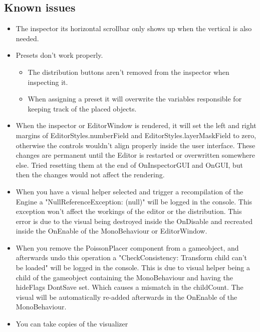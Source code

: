 \documentclass{paper}
\begin{document}
\newpage
\subsection{Known issues}
\begin{itemize}
\item The inspector its horizontal scrollbar only shows up when the vertical is also needed.
\item Presets don't work properly.
\begin{itemize}[noitemsep]
\item The distribution buttons aren't removed from the inspector when inspecting it.
\item When assigning a preset it will overwrite the variables responsible for keeping track of the placed objects.
\end{itemize}
\item When the inspector or EditorWindow is rendered, it will set the left and right margins of EditorStyles.numberField and EditorStyles.layerMaskField to zero, otherwise the controls wouldn't align properly inside the user interface. These changes are permanent until the Editor is restarted or overwritten somewhere else. Tried resetting them at the end of OnInspectorGUI and OnGUI, but then the changes would not affect the rendering.
\item When you have a visual helper selected and trigger a recompilation of the Engine a "NullReferenceException: (null)" will be logged in the console. This exception won't affect the workings of the editor or the distribution. This error is due to the visual being destroyed inside the OnDisable and recreated inside the OnEnable of the MonoBehaviour or EditorWindow.
\item When you remove the PoissonPlacer component from a gameobject, and afterwards undo this operation a "CheckConsistency: Transform child can't be loaded" will be logged in the console. This is due to visual helper being a child of the gameobject containing the MonoBehaviour and having the hideFlags DontSave set. Which causes a mismatch in the childCount. The visual will be automatically re-added afterwards in the OnEnable of the MonoBehaviour.
\item You can take copies of the visualizer
\end{itemize}

\newpage
\end{document}
